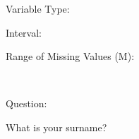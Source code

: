 \documentclass[
]{article}
\begin{document}
\begin{minipage}[t]{0.3\linewidth}

Variable Type:

\end{minipage}%
\begin{minipage}[t]{0.7\linewidth}

\end{minipage}

\begin{minipage}[t]{0.3\linewidth}

Interval:

\end{minipage}%
\begin{minipage}[t]{0.7\linewidth}

\end{minipage}

\begin{minipage}[t]{0.3\linewidth}

Range of Missing Values (M):

\end{minipage}%
\begin{minipage}[t]{0.7\linewidth}

~

\end{minipage}

\begin{minipage}[t]{0.3\linewidth}

Question:

\end{minipage}%
\begin{minipage}[t]{0.7\linewidth}

What is your surname?

\end{minipage}
\end{document}
